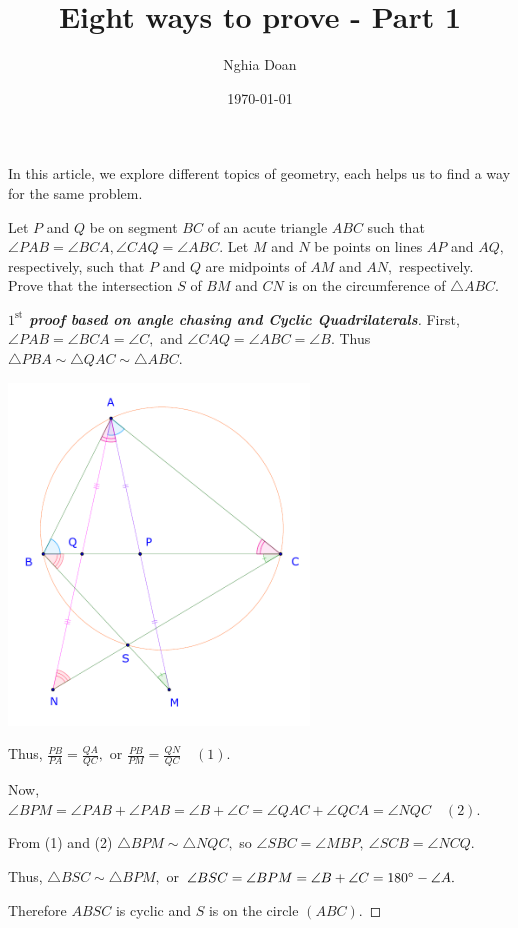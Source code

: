 \documentclass{article}
\title{Eight ways to prove - Part 1}
\author{Nghia Doan}
\date{\today}
\begin{document}
\maketitle

In this article, we explore different topics of geometry, each helps us to find a way for the same problem.

\begin{example*}
    Let $P$ and $Q$ be on segment $BC$ of an acute triangle $ABC$ such that $\angle PAB=\angle BCA, \angle CAQ=\angle ABC.$
    Let $M$ and $N$ be points on lines $AP$ and $AQ,$ respectively, such that $P$ and $Q$ are midpoints of $AM$ and $AN,$ respectively.
    Prove that the intersection $S$ of $BM$ and $CN$ is on the circumference of $\triangle ABC$.    
\end{example*}

\begin{proof}[\textbf{$1^{\text{st}}$ proof based on angle chasing and Cyclic Quadrilaterals}]

    First, $\angle PAB = \angle BCA = \angle C,$ and $\angle CAQ = \angle ABC = \angle B.$
    Thus $\triangle PBA \sim \triangle QAC \sim \triangle ABC.$

    \begin{center}
        \includegraphics[width=8cm]{./svg/pdf/ot-22-23-4-e2-s1.pdf}
    \end{center}
    
    Thus, $\frac{PB}{PA} = \frac{QA}{QC},$ or $\frac{PB}{PM} = \frac{QN}{QC} \quad (1).$
     
    Now, $\angle BPM = \angle PAB + \angle PAB = \angle B + \angle C = \angle QAC + \angle QCA = \angle NQC \quad (2).$

    From (1) and (2) $\triangle BPM \sim \triangle NQC,$ so $\angle SBC = \angle MBP,\ \angle SCB = \angle NCQ.$

    Thus, $\triangle BSC \sim \triangle BPM,$ or $\angle BSC = \angle BPM = \angle B + \angle C = 180^\circ  - \angle A.$

    Therefore $ABSC$ is cyclic and $S$ is on the circle $(ABC).$
\end{proof}
\end{document}
